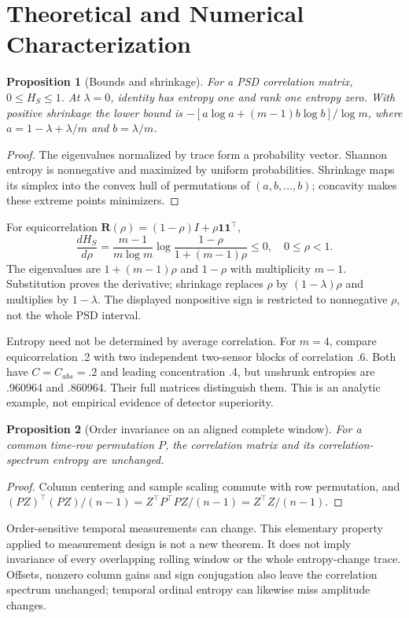 \documentclass[conference]{IEEEtran}
\newtheorem{proposition}{Proposition}
\newcommand{\R}{\mathbf R}
\begin{document}
\section{Theoretical and Numerical Characterization}

\begin{proposition}[Bounds and shrinkage]
For a PSD correlation matrix, $0\leq H_S\leq1$. At $\lambda=0$, identity
has entropy one and rank one entropy zero. With positive shrinkage the lower
bound is $-[a\log a+(m-1)b\log b]/\log m$, where
$a=1-\lambda+\lambda/m$ and $b=\lambda/m$.
\end{proposition}

\begin{proof}
The eigenvalues normalized by trace form a probability vector. Shannon
entropy is nonnegative and maximized by uniform probabilities. Shrinkage maps
its simplex into the convex hull of permutations of $(a,b,\ldots,b)$;
concavity makes these extreme points minimizers.\end{proof}

For equicorrelation $\R(\rho)=(1-\rho)I+\rho\mathbf1\mathbf1^\top$,
\begin{equation}
\frac{dH_S}{d\rho}=\frac{m-1}{m\log m}
\log\frac{1-\rho}{1+(m-1)\rho}\leq0,\quad 0\leq\rho<1.
\end{equation}
The eigenvalues are $1+(m-1)\rho$ and $1-\rho$ with multiplicity $m-1$.
Substitution proves the derivative; shrinkage replaces $\rho$ by
$(1-\lambda)\rho$ and multiplies by $1-\lambda$. The displayed nonpositive
sign is restricted to nonnegative $\rho$, not the whole PSD interval.

Entropy need not be determined by average correlation. For $m=4$, compare
equicorrelation .2 with two independent two-sensor blocks of correlation .6.
Both have $C=C_{abs}=.2$ and leading concentration .4, but unshrunk entropies
are .960964 and .860964. Their full matrices distinguish them. This is an
analytic example, not empirical evidence of detector superiority.

\begin{proposition}[Order invariance on an aligned complete window]
For a common time-row permutation $P$, the correlation matrix and its
correlation-spectrum entropy are unchanged.
\end{proposition}
\begin{proof}
Column centering and sample scaling commute with row permutation, and
$(PZ)^\top(PZ)/(n-1)=Z^\top P^\top PZ/(n-1)=Z^\top Z/(n-1)$.
\end{proof}
Order-sensitive temporal measurements can change. This elementary property
applied to measurement design is not a new theorem. It does not imply invariance
of every overlapping rolling window or the whole entropy-change trace. Offsets,
nonzero column gains and sign conjugation also leave the correlation spectrum
unchanged; temporal ordinal entropy can likewise miss amplitude changes.
\end{document}
